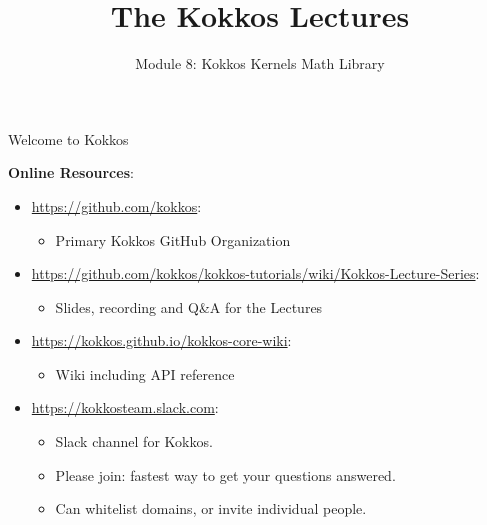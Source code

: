 
\def\sandid{SAND2020-9315 TR}

\title{The Kokkos Lectures}

\author{Module 8: Kokkos Kernels Math Library}




\shortfalse
\mediumtrue
\fulltrue
\notoverviewtrue



\begin{frame}
	\titlepage
\end{frame}

\begin{frame}[fragile]{Welcome to Kokkos}

\textbf{Online Resources}:

\begin{itemize}
        \item \url{https://github.com/kokkos}:
                \begin{itemize}
                        \item Primary Kokkos GitHub Organization
                \end{itemize}
        \item \url{https://github.com/kokkos/kokkos-tutorials/wiki/Kokkos-Lecture-Series}:
                \begin{itemize}
			\item{Slides, recording and Q\&A for the Lectures}
                \end{itemize}
        \item \url{https://kokkos.github.io/kokkos-core-wiki}:
                \begin{itemize}
                        \item Wiki including API reference
                \end{itemize}
        \item \url{https://kokkosteam.slack.com}:
                \begin{itemize}
                        \item Slack channel for Kokkos.
                        \item Please join: fastest way to get your questions answered.
                        \item Can whitelist domains, or invite individual people.
                \end{itemize}
\end{itemize}

\end{frame}


